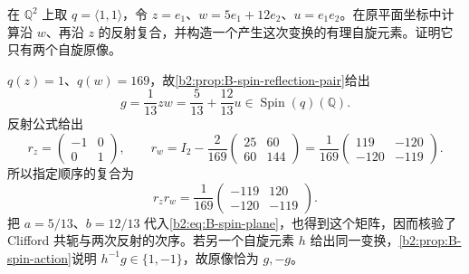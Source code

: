 \begin{exercise}\label{b2:ex:B-clifford-reflection-product}
	在 \(\mathbb Q^2\) 上取 \(q=\langle1,1\rangle\)，令 \(z=e_1\)、\(w=5e_1+12e_2\)、\(u=e_1e_2\)。在原平面坐标中计算沿 \(w\)、再沿 \(z\) 的反射复合，并构造一个产生这次变换的有理自旋元素。证明它只有两个自旋原像。
\end{exercise}
\begin{solution}
	\(q(z)=1\)、\(q(w)=169\)，故\cref{b2:prop:B-spin-reflection-pair}给出
	\[
		g=\frac1{13}zw=\frac5{13}+\frac{12}{13}u\in\operatorname{Spin}(q)(\mathbb Q).
	\]
	反射公式给出
	\[
		r_z=\begin{pmatrix}-1&0\\0&1\end{pmatrix},\qquad
		r_w=I_2-\frac2{169}\begin{pmatrix}25&60\\60&144\end{pmatrix}
		=\frac1{169}\begin{pmatrix}119&-120\\-120&-119\end{pmatrix}.
	\]
	所以指定顺序的复合为
	\[
		r_zr_w=\frac1{169}\begin{pmatrix}-119&120\\-120&-119\end{pmatrix}.
	\]
	把 \(a=5/13\)、\(b=12/13\) 代入\eqref{b2:eq:B-spin-plane}，也得到这个矩阵，因而核验了 Clifford 共轭与两次反射的次序。若另一个自旋元素 \(h\) 给出同一变换，\cref{b2:prop:B-spin-action}说明 \(h^{-1}g\in\{1,-1\}\)，故原像恰为 \(g,-g\)。
\end{solution}

